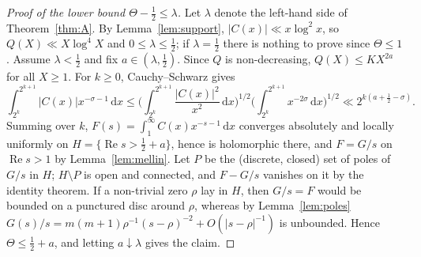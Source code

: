 \documentclass[11pt]{amsart}
\theoremstyle{remark}
\theoremstyle{definition}
\newcommand{\dd}{\,\mathrm{d}}
\renewcommand{\Re}{\operatorname{Re}}
\begin{document}
\begin{proof}[Proof of the lower bound $\Theta-\frac12\le\lambda$]
Let $\lambda$ denote the left-hand side of Theorem~\ref{thm:A}. By Lemma~\ref{lem:support}, $|C(x)|\ll x\log^2x$, so $Q(X)\ll X\log^4X$ and $0\le\lambda\le\frac12$; if $\lambda=\frac12$ there is nothing to prove since $\Theta\le1$. Assume $\lambda<\frac12$ and fix $a\in(\lambda,\frac12)$. Since $Q$ is non-decreasing, $Q(X)\le KX^{2a}$ for all $X\ge1$. For $k\ge0$, Cauchy--Schwarz gives
\[
\int_{2^k}^{2^{k+1}}|C(x)|x^{-\sigma-1}\dd x\le\Big(\int_{2^k}^{2^{k+1}}\frac{|C(x)|^2}{x^2}\dd x\Big)^{1/2}\Big(\int_{2^k}^{2^{k+1}}x^{-2\sigma}\dd x\Big)^{1/2}\ll2^{k(a+\frac12-\sigma)} .
\]
Summing over $k$, $F(s)=\int_1^\infty C(x)x^{-s-1}\dd x$ converges absolutely and locally uniformly on $H=\{\Re s>\frac12+a\}$, hence is holomorphic there, and $F=G/s$ on $\Re s>1$ by Lemma~\ref{lem:mellin}. Let $P$ be the (discrete, closed) set of poles of $G/s$ in $H$; $H\setminus P$ is open and connected, and $F-G/s$ vanishes on it by the identity theorem. If a non-trivial zero $\rho$ lay in $H$, then $G/s=F$ would be bounded on a punctured disc around $\rho$, whereas by Lemma~\ref{lem:poles} $G(s)/s=m(m+1)\rho^{-1}(s-\rho)^{-2}+O(|s-\rho|^{-1})$ is unbounded. Hence $\Theta\le\frac12+a$, and letting $a\downarrow\lambda$ gives the claim.
\end{proof}
\end{document}
